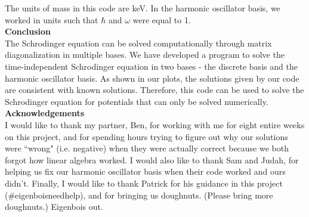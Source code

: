 \documentclass[%
 reprint,
 amsmath,amssymb,
 aps,
]{revtex4-1}
\begin{document}
\noindent The units of mass in this code are keV.  In the harmonic oscillator basis, we worked in units such that $\hbar$ and $\omega$ were equal to 1.\\

\noindent \textbf{Conclusion}\\

\noindent The Schrodinger equation can be solved computationally through matrix diagonalization in multiple bases.  We have developed a program to solve the time-independent Schrodinger equation in two bases - the discrete basis and the harmonic oscillator basis.  As shown in our plots, the solutions given by our code are consistent with known solutions.  Therefore, this code can be used to solve the Schrodinger equation for potentials that can only be solved numerically.\\

\noindent \textbf{Acknowledgements}\\

\noindent I would like to thank my partner, Ben, for working with me for eight entire weeks on this project, and for spending hours trying to figure out why our solutions were ``wrong" (i.e. negative) when they were actually correct because we both forgot how linear algebra worked.  I would also like to thank Sam and Judah, for helping us fix our harmonic oscillator basis when their code worked and ours didn't.  Finally, I would like to thank Patrick for his guidance in this project (\#eigenboisneedhelp), and for bringing us doughnuts.  (Please bring more doughnuts.)  Eigenbois out.
\end{document}
